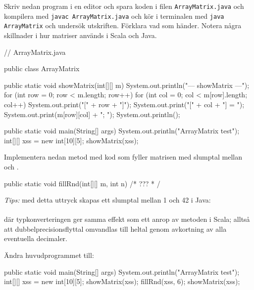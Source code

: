 \Subtask Skriv nedan program i en editor och spara koden i filen \texttt{ArrayMatrix.java} och kompilera med \texttt{javac ArrayMatrix.java} och kör i terminalen med \texttt{java ArrayMatrix} och undersök utskriften. Förklara vad som händer. Notera några skillnader i hur matriser används i Scala och Java.


\begin{Code}[language=Java]
// ArrayMatrix.java

public class ArrayMatrix {

    public static void showMatrix(int[][] m){
        System.out.println("\n--- showMatrix ---");
        for (int row = 0; row < m.length; row++){
            for (int col = 0; col < m[row].length; col++) {
                System.out.print("[" + row + "]");
                System.out.print("[" + col + "] = ");
                System.out.print(m[row][col] + "; ");
            }
            System.out.println();
        }
    }
    
    public static void main(String[] args) {
        System.out.println("ArrayMatrix test");
        int[][] xss = new int[10][5];
        showMatrix(xss);
    }
}
\end{Code}

\Subtask Implementera nedan metod  med kod som fyller matrisen  med slumptal mellan  och .
\begin{Code}[language=Java]
    public static void fillRnd(int[][] m, int n){
        /* ??? * /
    }
\end{Code}
\noindent \emph{Tips:} med detta uttryck skapas ett slumptal mellan 1 och 42 i Java:\\
 \\
där typkonverteringen  ger samma effekt som ett anrop av metoden  i Scala; alltså att dubbelprecisionsflyttal omvandlas till heltal genom avkortning av alla eventuella decimaler.


Ändra huvudprogrammet till:
\begin{Code}[language=Java]
    public static void main(String[] args) {
        System.out.println("ArrayMatrix test");
        int[][] xss = new int[10][5];
        showMatrix(xss);
        fillRnd(xss, 6);
        showMatrix(xss);
    }
\end{Code}

